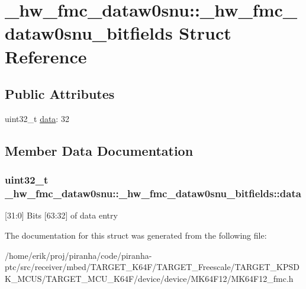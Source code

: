 \hypertarget{struct__hw__fmc__dataw0snu_1_1__hw__fmc__dataw0snu__bitfields}{}\section{\+\_\+hw\+\_\+fmc\+\_\+dataw0snu\+:\+:\+\_\+hw\+\_\+fmc\+\_\+dataw0snu\+\_\+bitfields Struct Reference}
\label{struct__hw__fmc__dataw0snu_1_1__hw__fmc__dataw0snu__bitfields}
\subsection*{Public Attributes}
\begin{DoxyCompactItemize}
\item 
uint32\+\_\+t \hyperlink{struct__hw__fmc__dataw0snu_1_1__hw__fmc__dataw0snu__bitfields_acc6e6b6ec0f37afe68a05c5dcd6ea106}{data}\+: 32
\end{DoxyCompactItemize}


\subsection{Member Data Documentation}
\subsubsection[{\texorpdfstring{data}{data}}]{\setlength{\rightskip}{0pt plus 5cm}uint32\+\_\+t \+\_\+hw\+\_\+fmc\+\_\+dataw0snu\+::\+\_\+hw\+\_\+fmc\+\_\+dataw0snu\+\_\+bitfields\+::data}\hypertarget{struct__hw__fmc__dataw0snu_1_1__hw__fmc__dataw0snu__bitfields_acc6e6b6ec0f37afe68a05c5dcd6ea106}{}\label{struct__hw__fmc__dataw0snu_1_1__hw__fmc__dataw0snu__bitfields_acc6e6b6ec0f37afe68a05c5dcd6ea106}
\mbox{[}31\+:0\mbox{]} Bits \mbox{[}63\+:32\mbox{]} of data entry 

The documentation for this struct was generated from the following file\+:\begin{DoxyCompactItemize}
\item 
/home/erik/proj/piranha/code/piranha-\/ptc/src/receiver/mbed/\+T\+A\+R\+G\+E\+T\+\_\+\+K64\+F/\+T\+A\+R\+G\+E\+T\+\_\+\+Freescale/\+T\+A\+R\+G\+E\+T\+\_\+\+K\+P\+S\+D\+K\+\_\+\+M\+C\+U\+S/\+T\+A\+R\+G\+E\+T\+\_\+\+M\+C\+U\+\_\+\+K64\+F/device/device/\+M\+K64\+F12/M\+K64\+F12\+\_\+fmc.\+h\end{DoxyCompactItemize}
